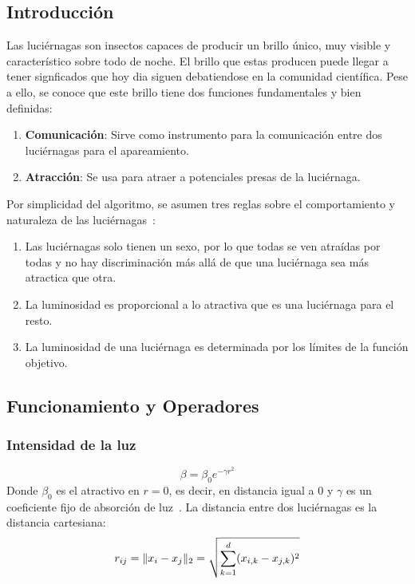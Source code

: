 \subsection{Introducción}
Las luciérnagas son insectos capaces de producir un brillo único, muy visible y característico sobre todo de noche. El brillo que estas producen puede llegar a tener signficados que hoy dia siguen debatiendose en la comunidad científica. Pese a ello, se conoce que este brillo tiene dos funciones fundamentales y bien definidas:
\begin{enumerate}
    \item \textbf{Comunicación}: Sirve como instrumento para la comunicación entre dos luciérnagas para el apareamiento.
    \item \textbf{Atracción}: Se usa para atraer a potenciales presas de la luciérnaga.
\end{enumerate}
Por simplicidad del algoritmo, se asumen tres reglas sobre el comportamiento y naturaleza de las luciérnagas~\cite{yang_chapter_2014}:
\begin{enumerate}
    \item Las luciérnagas solo tienen un sexo, por lo que todas se ven atraídas por todas y no hay discriminación más allá de que una luciérnaga sea más atractica que otra.
    \item La luminosidad es proporcional a lo atractiva que es una luciérnaga para el resto.
    \item La luminosidad de una luciérnaga es determinada por los límites de la función objetivo.
\end{enumerate}

\subsection{Funcionamiento y Operadores}
\subsubsection{Intensidad de la luz}
\begin{equation}
    \beta = \beta_0 e^{-\gamma r^2}
\end{equation}
Donde $\beta_0$ es el atractivo en $r=0$, es decir, en distancia igual a $0$ y $\gamma$ es un coeficiente fijo de absorción de luz~\cite{yang_chapter_2014}. La distancia entre dos luciérnagas es la distancia cartesiana:
\begin{equation}
    r_{ij}=\lVert x_i-x_j\rVert_2=\sqrt{\sum_{k=1}^d(x_{i,k}-x_{j,k})^2}
\end{equation}


